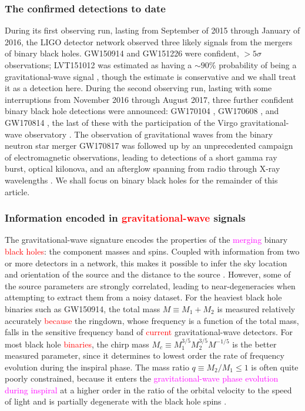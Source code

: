 \documentclass[iop,onecolumn]{revtex4}
\newcommand{\ajf}[1]{\textcolor{red}{#1}}
\newcommand{\ilya}[1]{\textcolor{magenta}{#1}}
\begin{document}
\subsubsection{The confirmed detections to date}
During its first observing run, lasting from September of 2015 through January of 2016, the LIGO detector network observed three likely signals from the mergers of binary black holes.  GW150914 \citep{GW150914} and GW151226 \citep{GW151226} were confident, $> 5\sigma$ observations; LVT151012 was estimated as having a $\sim 90\%$ probability of being a gravitational-wave signal \citep{GW150914:rates,BBH:O1}, though the estimate is conservative and we shall treat it as a detection here.  During the second observing run, lasting with some interruptions from November 2016 through August 2017, three further confident binary black hole detections were announced: GW170104 \citep{GW170104},  GW170608 \citep{GW170608}, and GW170814 \citep{GW170814}, the last of these with the participation of the Virgo gravitational-wave observatory \citep{AdvVirgo}.   The observation of gravitational waves from the binary neutron star merger GW170817 \citep{GW170817} was followed up by an unprecedented campaign of electromagnetic observations, leading to detections of a short gamma ray burst, optical kilonova, and an afterglow spanning from radio through X-ray wavelengths \citep{GW170817:GRB,GW170817:MMA}.  We shall focus on binary black holes for the remainder of this article.

\subsubsection{Information encoded in \ajf{gravitational-wave} signals}
The gravitational-wave signature encodes the properties of the \ilya{merging} binary \ajf{black holes}: the component masses and spins. Coupled with information from two or more detectors in a network, this makes it possible to infer the sky location and orientation of the source and the distance to the source \ilya{\citep{Veitch:2014,GW150914:PE}}.  However, some of the source parameters are strongly correlated, leading to near-degeneracies when attempting to extract them from a noisy dataset.   For the heaviest black hole binaries such as GW150914, the total mass $M \equiv M_1 + M_2$ is measured relatively accurately \ajf{because} the ringdown, whose frequency is a function of the total mass, falls in the sensitive frequency band of \ajf{current} gravitational-wave detectors.  For most black hole \ajf{binaries}, the chirp mass $M_c \equiv M_1^{3/5} M_2^{3/5} M^{-1/5}$ is the better measured parameter, since it determines to lowest order the rate of frequency evolution during the inspiral phase.  The mass ratio $q\equiv M_2/M_1 \leq 1$ is often quite poorly constrained, because it enters the \ilya{gravitational-wave phase evolution during inspiral} at a higher order in the ratio of the orbital velocity to the speed of light and is partially degenerate with the black hole spins \citep[e.g.,][]{PoissonWill:1995}.  
\end{document}
